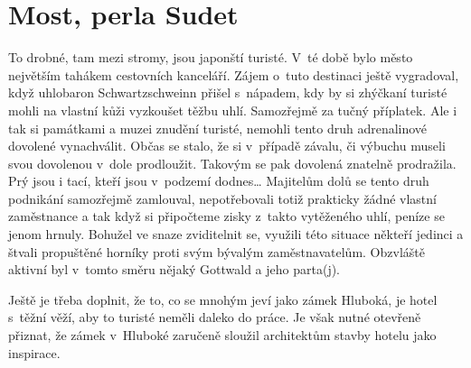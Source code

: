 
\chapter{Most, perla Sudet}

To drobné, tam mezi stromy, jsou japonští turisté. V~té době bylo město
největším tahákem cestovních kanceláří. Zájem o~tuto destinaci ještě
vygradoval, když uhlobaron Schwartzschweinn přišel s~nápadem, kdy by si
zhýčkaní turisté mohli na vlastní kůži vyzkoušet těžbu uhlí. Samozřejmě za
tučný příplatek. Ale i tak si památkami a muzei znudění turisté, nemohli tento
druh adrenalinové dovolené vynachválit. Občas se stalo, že si v~případě závalu,
či výbuchu museli svou dovolenou v~dole prodloužit. Takovým se pak dovolená
znatelně prodražila. Prý jsou i tací, kteří jsou v~podzemí dodnes… Majitelům
dolů se tento druh podnikání samozřejmě zamlouval, nepotřebovali totiž
prakticky žádné vlastní zaměstnance a tak když si připočteme zisky z~takto
vytěženého uhlí, peníze se jenom hrnuly. Bohužel ve snaze zviditelnit se,
využili této situace někteří jedinci a štvali propuštěné horníky proti svým
bývalým zaměstnavatelům. Obzvláště aktivní byl v~tomto směru nějaký Gottwald a
jeho parta(j).

Ještě je třeba doplnit, že to, co se mnohým jeví jako zámek Hluboká, je hotel
s~těžní věží, aby to turisté neměli daleko do práce. Je však nutné otevřeně
přiznat, že zámek v~Hluboké zaručeně sloužil architektům stavby hotelu jako
inspirace.
